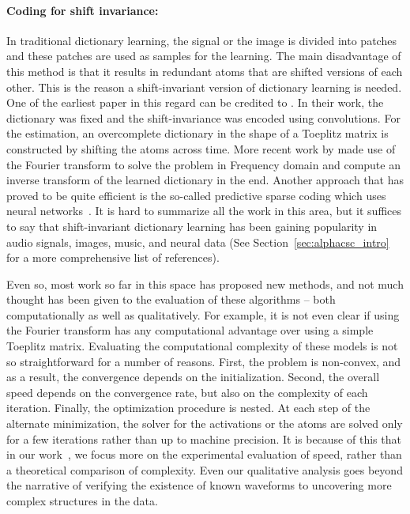 \paragraph{Coding for shift invariance:}
In traditional dictionary learning, the signal or the image is divided into patches and these patches are used as samples for the learning. The main disadvantage of this method is that it results in redundant atoms that are shifted versions of each other. This is the reason a shift-invariant version of dictionary learning is needed. One of the earliest paper in this regard can be credited to \cite{lewicki1999coding}. In their work, the dictionary was fixed and the shift-invariance was encoded using convolutions. For the estimation, an overcomplete dictionary in the shape of a Toeplitz matrix is constructed by shifting the atoms across time. More recent work by \cite{grosse2012shift} made use of the Fourier transform to solve the problem in Frequency domain and compute an inverse transform of the learned dictionary in the end. Another approach that has proved to be quite efficient is the so-called predictive sparse coding which uses neural networks~\citep{kavukcuoglu2010learning}. It is hard to summarize all the work in this area, but it suffices to say that shift-invariant dictionary learning has been gaining popularity in audio signals, images, music, and neural data (See Section~\ref{sec:alphacsc_intro} for a more comprehensive list of references).


Even so, most work so far in this space has proposed new methods, and not much thought has been given to the evaluation of these algorithms -- both computationally as well as qualitatively. For example, it is not even clear if using the Fourier transform has any computational advantage over using a simple Toeplitz matrix. Evaluating the computational complexity of these models is not so straightforward for a number of reasons. First, the problem is non-convex, and as a result, the convergence depends on the initialization. Second, the overall speed depends on the convergence rate, but also on the complexity of each iteration. Finally, the optimization procedure is nested. At each step of the alternate minimization, the solver for the activations or the atoms are solved only for a few iterations rather than up to machine precision. It is because of this that in our work~\citep{jas2017learning}, we focus more on the experimental evaluation of speed, rather than a theoretical comparison of complexity. Even our qualitative analysis goes beyond the narrative of verifying the existence of known waveforms to uncovering more complex structures in the data. 

